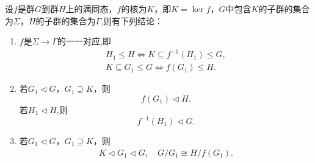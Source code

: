 \documentclass[../../main.tex]{subfiles}%
\begin{document}
\begin{theorem}\label{theorem:抽象代数-定理1.7.2}
设$f$是群$G$到群$H$上的满同态，$f$的核为$K$，即$K = \ker f$，$G$中包含$K$的子群的集合为$\Sigma$，$H$的子群的集合为$\Gamma$,则有下列结论：
\begin{enumerate}[(1)]
\item\label{theorem:抽象代数-定理1.7.2-1} $f$是$\Sigma \to \Gamma$的一一对应,即
\begin{gather*}
H_1\leqslant H\iff K\subseteq f^{-1}(H_1)\leqslant G,
\\
K\subseteq G_1\leqslant G \iff f(G_1)\leqslant H.
\end{gather*}

\item\label{theorem:抽象代数-定理1.7.2-2} 若$G_1 \lhd G$，$G_1 \supseteq K$，则$$f(G_1)\lhd H.$$
若$H_1 \lhd H$,则$$f^{-1}(H_1)\lhd G.$$

\item\label{theorem:抽象代数-定理1.7.2-3} 若$G_1 \lhd G$，$G_1 \supseteq K$，则
\begin{align}
K\lhd G_1\lhd G,\quad G/G_1 \cong H/f(G_1).\label{eq:1.gdgp9343f43dc3237.2}
\end{align}
\end{enumerate}
\end{theorem}
\end{document}
